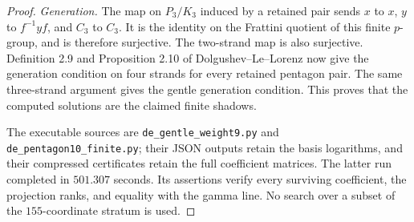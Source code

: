 \begin{proof}
\emph{Generation.}
The map on $P_3/K_3$ induced by a retained pair sends
$x$ to $x$, $y$ to $f^{-1}yf$, and $C_3$ to $C_3$.
It is the identity on the Frattini quotient of this finite
$p$-group, and is therefore surjective. The two-strand map is
also surjective. Definition 2.9 and Proposition 2.10 of
Dolgushev--Le--Lorenz \cite{DE_DolgushevLeLorenz2024} now
give the generation condition on four strands for every retained
pentagon pair. The same three-strand argument gives the gentle
generation condition. This proves that the computed solutions
are the claimed finite shadows.

The executable sources are
\texttt{de\_gentle\_weight9.py} and
\texttt{de\_pentagon10\_finite.py}; their JSON outputs retain
the basis logarithms, and their compressed certificates retain
the full coefficient matrices. The latter run completed in
$501.307$ seconds. Its assertions verify every surviving
coefficient, the projection ranks, and equality with the gamma
line. No search over a subset of the $155$-coordinate stratum
is used.
\end{proof}


